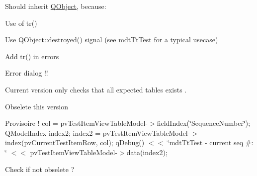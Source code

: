 \begin{DoxyRefList}
\item[\label{todo__todo000062}%
\hypertarget{todo__todo000062}{}%
Class \hyperlink{classmdt_tt_base}{mdt\-Tt\-Base} ]Should inherit \hyperlink{class_q_object}{Q\-Object}, because\-:
\begin{DoxyItemize}
\item Use of tr()
\item Use Q\-Object\-::destroyed() signal (see \hyperlink{classmdt_tt_test}{mdt\-Tt\-Test} for a typical usecase)  
\end{DoxyItemize}
\item[\label{todo__todo000061}%
\hypertarget{todo__todo000061}{}%
Member \hyperlink{classmdt_tt_base_a6dbd221d1518e30c3692a7ba54b57c03}{mdt\-Tt\-Base\-:\-:mdt\-Tt\-Base} (\hyperlink{class_q_object}{Q\-Object} $\ast$parent, Q\-Sql\-Database db)]Add tr() in errors  
\item[\label{todo__todo000063}%
\hypertarget{todo__todo000063}{}%
Member \hyperlink{classmdt_tt_basic_tester_window_a55ed2ee382f4d560e5c5e055e69b7a6d}{mdt\-Tt\-Basic\-Tester\-Window\-:\-:init} ()]Error dialog !!  
\item[\label{todo__todo000064}%
\hypertarget{todo__todo000064}{}%
Member \hyperlink{classmdt_tt_database_schema_ace92b340a68ce07ad477502a68de4514}{mdt\-Tt\-Database\-Schema\-:\-:check\-Schema} ()]Current version only checks that all expected tables exists . 
\item[\label{todo__todo000076}%
\hypertarget{todo__todo000076}{}%
Member \hyperlink{classmdt_tt_logical_test_cable_a5abe6257d4ca126550b9ca9fb31a1ebc}{mdt\-Tt\-Logical\-Test\-Cable\-:\-:add\-Link} (const Q\-Variant \&test\-Connection\-Id, const Q\-Variant \&dut\-Connection\-Id, const Q\-Variant \&test\-Cable\-Id, const Q\-Variant \&identification, const Q\-Variant \&value)]Obselete this version  
\item[\label{todo__todo000077}%
\hypertarget{todo__todo000077}{}%
Member \hyperlink{classmdt_tt_test_a71e868fa2c182b33982276e52f9c4d23}{mdt\-Tt\-Test\-:\-:get\-Setup\-Data} (const Q\-Variant \&test\-Model\-Item\-Id, bool \&ok)]Provisoire ! col = pv\-Test\-Item\-View\-Table\-Model-\/$>$field\-Index(\char`\"{}\-Sequence\-Number\char`\"{}); Q\-Model\-Index index2; index2 = pv\-Test\-Item\-View\-Table\-Model-\/$>$index(pv\-Current\-Test\-Item\-Row, col); q\-Debug() $<$$<$ \char`\"{}mdt\-Tt\-Test -\/ current seq \#\-: \char`\"{} $<$$<$ pv\-Test\-Item\-View\-Table\-Model-\/$>$data(index2); 
\item[\label{todo__todo000079}%
\hypertarget{todo__todo000079}{}%
Class \hyperlink{classmdt_tt_test_data}{mdt\-Tt\-Test\-Data} ]Check if not obselete ?  

\end{DoxyRefList}
